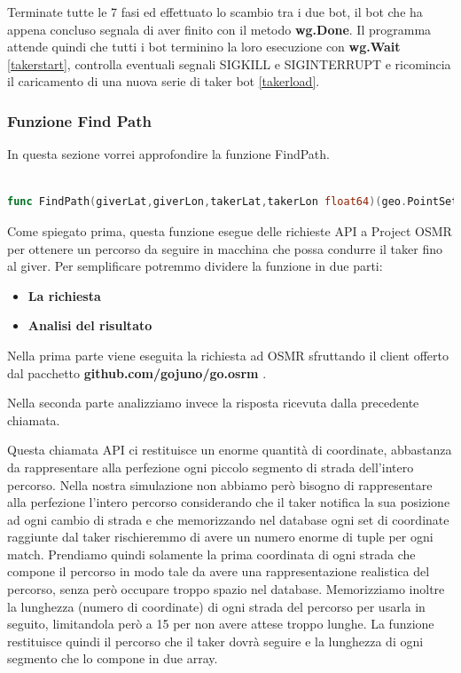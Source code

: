 \documentclass[main.tex]{subfiles}
\begin{document}
Terminate tutte le 7 fasi ed effettuato lo scambio tra i due bot, il bot che ha appena concluso segnala di aver finito con il metodo \textbf{wg.Done}. Il programma attende quindi che tutti i bot terminino la loro esecuzione con \textbf{wg.Wait} \ref{takerstart}, controlla eventuali segnali SIGKILL e SIGINTERRUPT e ricomincia il caricamento di una nuova serie di taker bot \ref{takerload}. 


\subsubsection{Funzione Find Path}\label{FindPath}
In questa sezione vorrei approfondire la funzione FindPath.

\begin{lstlisting}[language=go]

func FindPath(giverLat,giverLon,takerLat,takerLon float64)(geo.PointSet,[]int,error){}

\end{lstlisting}
Come spiegato prima, questa funzione esegue delle richieste API a Project OSMR \cite{osmr} per ottenere un percorso da seguire in macchina che possa condurre il taker fino al giver. \newline
Per semplificare potremmo dividere la funzione in due parti:

\begin{itemize}
    \item \textbf{La richiesta}
    \item \textbf{Analisi del risultato}
\end{itemize}

Nella prima parte viene eseguita la richiesta ad OSMR sfruttando il client offerto dal pacchetto \textbf{github.com/gojuno/go.osrm} \cite{gojuno}.



Nella seconda parte analizziamo invece la risposta ricevuta dalla precedente chiamata.


Questa chiamata API ci restituisce un enorme quantità di coordinate, abbastanza da rappresentare alla perfezione ogni piccolo segmento di strada dell'intero percorso. Nella nostra simulazione non abbiamo però bisogno di rappresentare alla perfezione l'intero percorso considerando che il taker notifica la sua posizione ad ogni cambio di strada e che memorizzando nel database ogni set di coordinate raggiunte dal taker rischieremmo di avere un numero enorme di tuple per ogni match. Prendiamo quindi solamente la prima coordinata di ogni strada che compone il percorso in modo tale da avere una rappresentazione realistica del percorso, senza però occupare troppo spazio nel database. Memorizziamo inoltre la lunghezza (numero di coordinate) di ogni strada del percorso per usarla in seguito, limitandola però a 15 per non avere attese troppo lunghe. \newline
La funzione restituisce quindi il percorso che il taker dovrà seguire e la lunghezza di ogni segmento che lo compone in due array.
\end{document}

